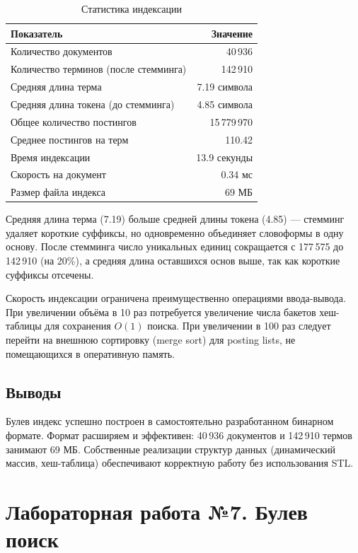 \documentclass[a4paper,12pt]{article}
\begin{document}
\begin{table}[H]
    \centering
    \caption{Статистика индексации}
    \begin{tabular}{lr}
        \toprule
        \textbf{Показатель} & \textbf{Значение} \\
        \midrule
        Количество документов & 40\,936 \\
        Количество терминов (после стемминга) & 142\,910 \\
        Средняя длина терма & 7.19 символа \\
        Средняя длина токена (до стемминга) & 4.85 символа \\
        Общее количество постингов & 15\,779\,970 \\
        Среднее постингов на терм & 110.42 \\
        Время индексации & 13.9 секунды \\
        Скорость на документ & 0.34 мс \\
        Размер файла индекса & 69 МБ \\
        \bottomrule
    \end{tabular}
\end{table}

Средняя длина терма (7.19) больше средней длины токена (4.85) --- стемминг удаляет короткие суффиксы, но одновременно объединяет словоформы в одну основу. После стемминга число уникальных единиц сокращается с 177\,575 до 142\,910 (на 20\%), а средняя длина оставшихся основ выше, так как короткие суффиксы отсечены.

Скорость индексации ограничена преимущественно операциями ввода-вывода. При увеличении объёма в 10 раз потребуется увеличение числа бакетов хеш-таблицы для сохранения $O(1)$ поиска. При увеличении в 100 раз следует перейти на внешнюю сортировку (merge sort) для posting lists, не помещающихся в оперативную память.

\subsection{Выводы}

Булев индекс успешно построен в самостоятельно разработанном бинарном формате. Формат расширяем и эффективен: 40\,936 документов и 142\,910 термов занимают 69 МБ. Собственные реализации структур данных (динамический массив, хеш-таблица) обеспечивают корректную работу без использования STL.


\newpage
\section{Лабораторная работа №7. Булев поиск}
\end{document}
